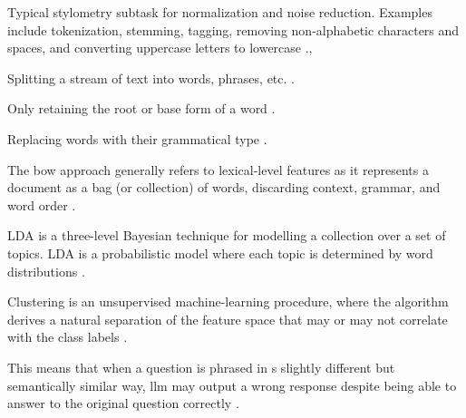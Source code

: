 \begin{definition}
    Typical stylometry subtask for normalization and noise reduction.
    Examples include tokenization, stemming, tagging, removing non-alphabetic characters and spaces, and converting uppercase letters to lowercase \cite{neal_surveying_2018}.,
\end{definition}

\begin{definition}
    [Tokenization]
    Splitting a stream of text into words, phrases, etc. \cite{neal_surveying_2018}.
\end{definition}

\begin{definition}
    [Stemming]
    Only retaining the root or base form of a word \cite{neal_surveying_2018}.
\end{definition}

\begin{definition}
    [Tagging]
    Replacing words with their grammatical type \cite{neal_surveying_2018}.
\end{definition}

\begin{definition}
    [\ac{bow}]
    The \ac{bow} approach generally refers to lexical-level features as it represents a document as a bag (or collection) of words, 
    discarding context, grammar, and word order \cite{neal_surveying_2018}.
\end{definition}

\begin{definition}
    LDA is a three-level Bayesian technique for modelling a collection over a set of topics.
    LDA is a probabilistic model where each topic is determined by word distributions \cite{neal_surveying_2018}.
\end{definition}

\begin{definition}
    [Clustering]
    Clustering is an unsupervised machine-learning procedure, where the algorithm derives a natural separation of the feature space 
    that may or may not correlate with the class labels \cite{neal_surveying_2018}.
\end{definition}

\begin{definition}
    This means that when a question is phrased in s slightly different but semantically similar way, 
    \ac{llm} may output a wrong response despite being able to answer to the original question correctly \cite{fu_learning_2024}.
\end{definition}


